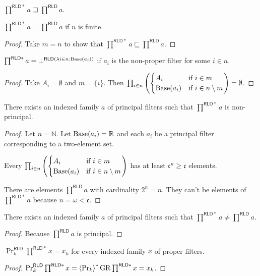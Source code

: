 \begin{obvious}
$\prod^{\mathsf{RLD}\ast}a\sqsupseteq\prod^{\mathsf{RLD}}a$.\end{obvious}
\begin{prop}
$\prod^{\mathsf{RLD}\ast}a=\prod^{\mathsf{RLD}}a$ if $n$ is finite.\end{prop}
\begin{proof}
Take $m=n$ to show that $\prod^{\mathsf{RLD}\ast}a\sqsubseteq\prod^{\mathsf{RLD}}a$.\end{proof}
\begin{prop}
$\prod^{\mathsf{RLD}\ast}a=\bot^{\mathsf{RLD}(\lambda i\in n:\operatorname{Base}(a_{i}))}$
if $a_{i}$ is the non-proper filter for some $i\in n$.\end{prop}
\begin{proof}
Take $A_{i}=\emptyset$ and $m=\{i\}$. Then $\prod_{i\in n}\left(\begin{cases}
A_{i} & \text{if }i\in m\\
\operatorname{Base}(a_{i}) & \text{if }i\in n\setminus m
\end{cases}\right)=\emptyset$.\end{proof}
\begin{example}
There exists an indexed family $a$ of principal filters such that
$\prod^{\mathsf{RLD}\ast}a$ is non-principal.\end{example}
\begin{proof}
Let $n=\mathbb{N}$. Let $\operatorname{Base}(a_{i})=\mathbb{R}$ and each $a_{i}$
be a principal filter corresponding to a two-element set.

Every $\prod_{i\in n}\left(\begin{cases}
A_{i} & \text{if }i\in m\\
\operatorname{Base}(a_{i}) & \text{if }i\in n\setminus m
\end{cases}\right)$ has at least $\mathfrak{c}^{n}\geqslant\mathfrak{c}$ elements.

There are elements $\prod^{\mathsf{RLD}}a$ with cardinality $2^{n}=n$.
They can't be elements of $\prod^{\mathsf{RLD}\ast}a$ because $n=\omega<\mathfrak{c}$.\end{proof}
\begin{cor}
There exists an indexed family $a$ of principal filters such that
$\prod^{\mathsf{RLD}\ast}a\neq\prod^{\mathsf{RLD}}a$.\end{cor}
\begin{proof}
Because $\prod^{\mathsf{RLD}}a$ is principal.\end{proof}
\begin{prop}
$\Pr_{k}^{\mathsf{RLD}}\prod^{\mathsf{RLD}\ast}x=x_{k}$ for every
indexed family $x$ of proper filters.\end{prop}
\begin{proof}
$\Pr_{k}^{\mathsf{RLD}}\prod^{\mathsf{RLD}\ast}x=\left\langle \Pr_{k}\right\rangle ^{\ast}\operatorname{GR}\prod^{\mathsf{RLD}\ast}x=x_{k}$.
\end{proof}


